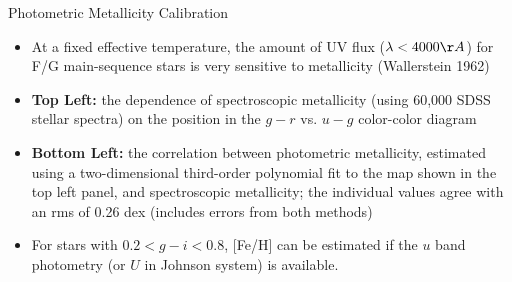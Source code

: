 \documentclass[letterpaper,landscape]{slides}
\begin{document}
\begin{slide}
{\begin{minipage}[t]{8cm}
\begin{center}
\end{center}
\end{minipage}

\begin{minipage}[t]{16cm}
\begin{center}
\vskip -1in
{\large \color{red} Photometric Metallicity Calibration}
\end{center}

\begin{itemize}
\item {\color{blue} At a fixed effective temperature, the amount of 
       UV flux ($\lambda<4000 \AA$) for F/G main-sequence stars is very 
       sensitive to metallicity (Wallerstein 1962)}
\item {\bf Top Left:} the dependence of spectroscopic metallicity 
      (using 60,000 SDSS stellar spectra) on the position in the $g-r$ vs. 
       $u-g$ color-color diagram 
\item {\bf Bottom Left:} the correlation between photometric metallicity,
      estimated using a two-dimensional third-order polynomial fit to the
      map shown in the top left panel, and spectroscopic metallicity; 
      the individual values agree with an rms of 0.26 dex (includes errors
      from both methods)
\item {\color{blue} For stars with $0.2<g-i<0.8$, [Fe/H] can be estimated 
      if the $u$ band photometry (or $U$ in Johnson system) is available.}
\end{itemize}

\end{minipage}}
\vfill 
\end{slide}
\end{document}
